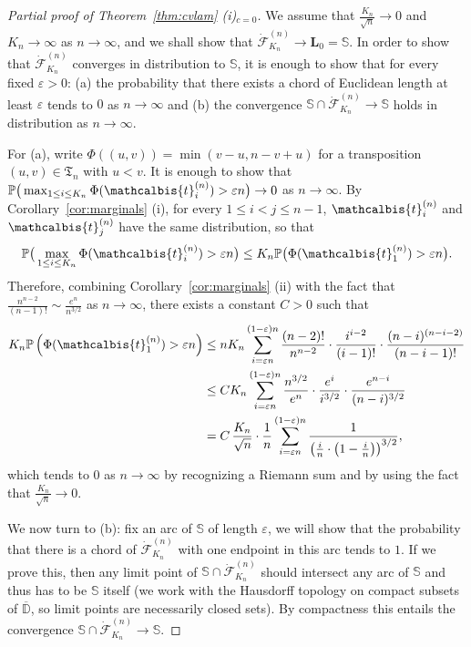 \documentclass[10pt]{amsart}
\theoremstyle{definition}\newtheorem{defi}[theo]{Definition}\newtheorem{rema}[theo]{Remark}\newtheorem{exam}[theo]{Example}\newtheorem{exem}[theo]{Example}\newtheorem{nota}[theo]{Notation}
\newcommand{\D}{\mathbb{D}}
\def\S{\mathbb{S}}
\def\eps{\varepsilon}
\def\dFKn{\dot{\mathcal{F}}^{(n)}_{K_{n}}}
\def\tb{\mathcalbis{t}}
\renewcommand{\epsilon}{\varepsilon}
\renewcommand\Pr[1]{\mathbb{P}\left(#1\right)}
\newcommand\Prb[1]{\mathbb{P}\big(#1\big)}
\begin{document}
\begin{proof}[Partial proof of Theorem~\ref{thm:cvlam} (i)$_{c=0}$] We assume  that $ \frac{K_{n}}{\sqrt{n}} \rightarrow 0$ and $K_{n} \rightarrow \infty$ as $n \rightarrow \infty$, and we shall show that $\dFKn \rightarrow \mathbf{L}_{0}=\mathbb{S}$. In order to show that $\dFKn $ converges in distribution to $ \S$, it is enough to show that for every fixed $\epsilon>0$: (a) the probability that there exists a chord of Euclidean length at least $\epsilon$ tends to $0$ as $n \rightarrow \infty$ and (b) the convergence $\S \cap \dFKn \rightarrow \S$ holds in distribution as $n \rightarrow \infty$.


For (a), write $ \Phi( (u,v))=\min(v-u,n-v+u)$ for a transposition $(u,v) \in \mathfrak T_n$ with $u<v$.
It is enough to show that $\Prb{\max_{1 \leq i \leq K_{n}} \Phi(\tb_{i}^{(n)}) > \epsilon n} \rightarrow 0$ as $n \rightarrow \infty$. By Corollary~\ref{cor:marginals} (i), for every $1 \leq i<j \leq n-1$, $\tb_{i}^{(n)}$ and $\tb_{j}^{(n)}$ have the same distribution, so that
$$\Prb{\max_{1 \leq i \leq K_{n}} \Phi(\tb_{i}^{(n)}) > \epsilon n} \leq K_{n} \Prb{\Phi(\tb_{1}^{(n)})>\epsilon n}.$$
Therefore, combining Corollary~\ref{cor:marginals} (ii) with the fact that  $ \frac{n^{n-2}}{(n-1)!} \sim  \tfrac{e^{n}}{n^{3/2}}$ as $ n \rightarrow \infty$, there exists a constant $C>0$ such that
\begin{align*}
K_{n} \Pr{\Phi(\tb_{1}^{(n)})>\epsilon n} & \leq  n K_{n} \sum_{i=  \epsilon n}^{ (1-\epsilon)n}  \frac{(n-2)!}{n^{n-2}} \cdot \frac{i^{i-2}}{(i-1)!} \cdot \frac{(n-i)^{(n-i-2)}}{(n-i-1)!}\\
& \leq  C  K_{n}  \sum_{i=  \epsilon n}^{ (1-\epsilon)n}   \frac{n^{3/2}}{e^{n}} \cdot  \frac{e^{i}}{i^{3/2}} \cdot  \frac{e^{n-i}}{(n-i)^{3/2}} \\
& =  C\, \frac{K_{n}}{\sqrt{n}} \cdot \frac{1}{n}    \sum_{i=  \epsilon n}^{ (1-\epsilon)n}  \frac{1}{ \left( \frac{i}{n} \cdot \left( 1- \frac{i}{n} \right)   \right) ^{3/2}},
\end{align*}
which tends to $0$ as $ n \rightarrow \infty$ by recognizing a Riemann sum and by using the fact that $\tfrac{K_{n}}{\sqrt{n}} \rightarrow 0$.

We now turn to (b):
fix an arc of $\S$ of length $\eps$, we will show that the probability
that there is a chord of $\dFKn$ with one endpoint in this arc tends to $1$.
If we prove this, then any limit point of $\S \cap \dFKn$ should intersect any arc of $\S$
and thus has to be $\S$ itself (we work with the Hausdorff topology on compact subsets of $\overline{\D}$, so limit points are necessarily closed sets).
By compactness this entails the convergence $\S \cap \dFKn \to \S$.


\end{proof}
\end{document}
